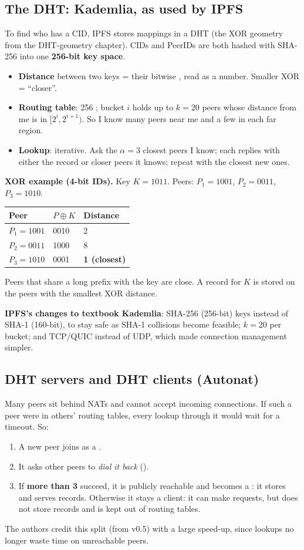 \subsection{The DHT: Kademlia, as used by IPFS}
To find who has a CID, IPFS stores mappings in a  DHT (the XOR geometry from the DHT-geometry chapter). CIDs and PeerIDs are both hashed with SHA-256 into
one \textbf{256-bit key space}.
\begin{itemize}
  \item \textbf{Distance} between two keys = their bitwise , read as a number. Smaller XOR = ``closer''.
  \item \textbf{Routing table}: 256 ; bucket $i$ holds up to $k = 20$ peers whose distance from me is in $[2^i, 2^{i+1})$. So I know many peers near me and a few
        in each far region.
  \item \textbf{Lookup}: iterative. Ask the $\alpha = 3$ closest peers I know; each replies with either the record or closer peers it knows; repeat with the closest new ones.
\end{itemize}
\textbf{XOR example (4-bit IDs).} Key $K = 1011$. Peers: $P_1 = 1001$, $P_2 = 0011$, $P_3 = 1010$.
\begin{center}
\begin{tabular}{@{}lll@{}}
\toprule
Peer & $P \oplus K$ & Distance\\
\midrule
$P_1 = 1001$ & 0010 & 2\\
$P_2 = 0011$ & 1000 & 8\\
$P_3 = 1010$ & 0001 & \textbf{1 (closest)}\\
\bottomrule
\end{tabular}
\end{center}
Peers that share a long prefix with the key are close. A record for $K$ is stored on the peers with the smallest XOR distance.

\textbf{IPFS's changes to textbook Kademlia}: SHA-256 (256-bit) keys instead of SHA-1 (160-bit), to stay safe as SHA-1 collisions become feasible; $k = 20$ per bucket;
and TCP/QUIC instead of UDP, which made connection management simpler.

\subsection{DHT servers and DHT clients (Autonat)}
Many peers sit behind NATs and cannot accept incoming connections. If such a peer were in others' routing tables, every lookup through it would wait for a timeout. So:
\begin{enumerate}
  \item A new peer joins as a .
  \item It asks other peers to \emph{dial it back} ().
  \item If \textbf{more than 3} succeed, it is publicly reachable and becomes a : it stores and serves records. Otherwise it stays a client: it can make
        requests, but does not store records and is kept out of routing tables.
\end{enumerate}
The authors credit this split (from v0.5) with a large speed-up, since lookups no longer waste time on unreachable peers.


